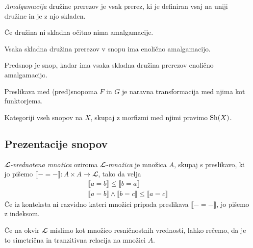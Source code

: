 \begin{definicija} %
  \emph{Amalgamacija} družine prerezov je vsak prerez, ki je definiran vsaj na
  uniji družine in je z njo skladen.
\end{definicija}

\begin{opomba}
  Če družina ni skladna očitno nima amalgamacije.
\end{opomba}
\begin{slogan}
  Vsaka skladna družina prerezov v snopu ima enolično amalgamacijo.
\end{slogan}
\begin{slogan}
  Predsnop je snop, kadar ima vsaka skladna družina prerezov enolično amalgamacijo.
\end{slogan}

\begin{definicija}
  Preslikava med (pred)snopoma \(F\) in \(G\) je naravna transformacija med
  njima kot funktorjema.
\end{definicija}

\begin{definicija}
  Kategoriji vseh snopov na \(X\), skupaj z morfizmi med njimi pravimo \(\textrm{Sh}{\left( X \right)}\).
\end{definicija}


\subsection{Prezentacije snopov}

\begin{definicija}
  \emph{\(𝓛\)-vrednotena množica} oziroma \emph{\(𝓛\)-množica} je množica \(A\),
  skupaj s preslikavo, ki jo pišemo \(⟦- = -⟧ : A×A → 𝓛\), tako da velja
  \begin{align*}
    ⟦ a = b ⟧ ≤ ⟦ b = a ⟧\\
    ⟦ a = b ⟧ ∧ ⟦ b = c ⟧ ≤ ⟦ a = c ⟧
  \end{align*}
  Če iz konteksta ni razvidno kateri množici pripada preslikava \(⟦- = -⟧\),
  jo pišemo z indeksom.
\end{definicija}

Če na okvir \(𝓛\) mislimo kot množico resničnostnih vrednosti, lahko rečemo, da
je to simetrična in tranzitivna relacija na množici \(A\).

